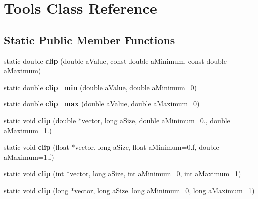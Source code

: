 \hypertarget{class_tools}{\section{Tools Class Reference}
\label{class_tools}
}
\subsection*{Static Public Member Functions}
\begin{DoxyCompactItemize}
\item 
\hypertarget{class_tools_aa96141a453a43b8c0a76a72f178299f9}{static double {\bfseries clip} (double a\-Value, const double a\-Minimum, const double a\-Maximum)}\label{class_tools_aa96141a453a43b8c0a76a72f178299f9}

\item 
\hypertarget{class_tools_a8cbc1147b5209fef2c47a1f4217cacec}{static double {\bfseries clip\-\_\-min} (double a\-Value, double a\-Minimum=0)}\label{class_tools_a8cbc1147b5209fef2c47a1f4217cacec}

\item 
\hypertarget{class_tools_a0f53acfe389e4d904d9b2418a59d57a3}{static double {\bfseries clip\-\_\-max} (double a\-Value, double a\-Maximum=0)}\label{class_tools_a0f53acfe389e4d904d9b2418a59d57a3}

\item 
\hypertarget{class_tools_acb6319ed3e5d1ef320cfba1504ed11c0}{static void {\bfseries clip} (double $\ast$vector, long a\-Size, double a\-Minimum=0., double a\-Maximum=1.)}\label{class_tools_acb6319ed3e5d1ef320cfba1504ed11c0}

\item 
\hypertarget{class_tools_ae1fa0a340b448bd5ffc5dac15ae66d8d}{static void {\bfseries clip} (float $\ast$vector, long a\-Size, float a\-Minimum=0.f, double a\-Maximum=1.f)}\label{class_tools_ae1fa0a340b448bd5ffc5dac15ae66d8d}

\item 
\hypertarget{class_tools_a57e4fe1a9a75ce8e570d9b3939a524ac}{static void {\bfseries clip} (int $\ast$vector, long a\-Size, int a\-Minimum=0, int a\-Maximum=1)}\label{class_tools_a57e4fe1a9a75ce8e570d9b3939a524ac}

\item 
\hypertarget{class_tools_a186ed50207e0868914ebcf1be204da0c}{static void {\bfseries clip} (long $\ast$vector, long a\-Size, long a\-Minimum=0, long a\-Maximum=1)}\label{class_tools_a186ed50207e0868914ebcf1be204da0c}


\end{DoxyCompactItemize}

